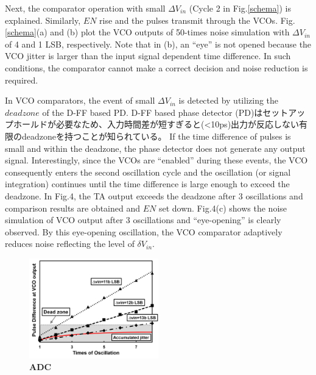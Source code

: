 \documentclass[letterpaper, 10 pt, conference]{ieeeconf}  %
\begin{document}
Next, the comparator operation with small $\Delta V_{in}$ (Cycle 2 in Fig.\ref{schema}) is explained. Similarly, $EN$ rise and the pulses transmit through the VCOs. Fig.\ref{schema}(a) and (b) plot the VCO outputs of 50-times noise simulation with $\Delta V_{in}$ of 4 and 1 LSB, respectively. Note that in (b), an “eye” is not opened because the VCO jitter is larger than the input signal dependent time difference. In such conditions, the comparator cannot make a correct decision and noise reduction is required.

In VCO comparators, the event of small $\Delta V_{in}$ is detected by utilizing the $deadzone$ of the D-FF based PD. D-FF based phase detector (PD)はセットアップホールドが必要なため、入力時間差が短すぎると(<10ps)出力が反応しない有限のdeadzoneを持つことが知られている。
If the time difference of pulses is small and within the deadzone, the phase detector does not generate any output signal. Interestingly, since the VCOs are “enabled” during these events, the VCO consequently enters the second oscillation cycle and the oscillation (or signal integration) continues until the time difference is large enough to exceed the deadzone.
In Fig.4, the TA output exceeds the deadzone after 3 oscillations and comparison results are obtained and $EN$ set down. Fig.4(c) shows the noise simulation of VCO output after 3 oscillations and “eye-opening” is clearly observed. By this eye-opening oscillation, the VCO comparator adaptively reduces noise reflecting the level of $\delta V_{in}$.

\begin{figure}[ht!]
\centering
 \includegraphics[width=0.5\textwidth]{figs/fig5.png}
  \captionsetup{font=footnotesize}
  \caption{\textbf{ADC}}
  \label{fig5}
\end{figure}
\end{document}
